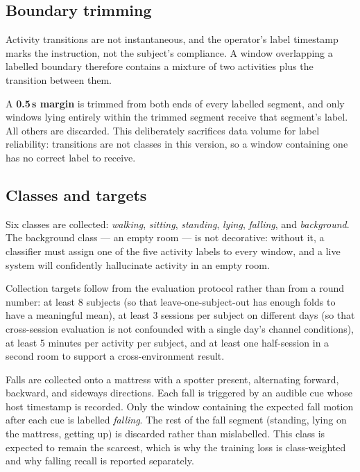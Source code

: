 \subsection{Boundary trimming}

Activity transitions are not instantaneous, and the operator's label
timestamp marks the instruction, not the subject's compliance. A window
overlapping a labelled boundary therefore contains a mixture of two
activities plus the transition between them.

A \textbf{0.5\,s margin} is trimmed from both ends of every labelled
segment, and only windows lying entirely within the trimmed segment receive
that segment's label. All others are discarded. This deliberately sacrifices
data volume for label reliability: transitions are not classes in this
version, so a window containing one has no correct label to receive.

\subsection{Classes and targets}

Six classes are collected: \emph{walking}, \emph{sitting}, \emph{standing},
\emph{lying}, \emph{falling}, and \emph{background}. The background class
--- an empty room --- is not decorative: without it, a classifier must
assign one of the five activity labels to every window, and a live system
will confidently hallucinate activity in an empty room.

Collection targets follow from the evaluation protocol rather than from a
round number: at least 8 subjects (so that leave-one-subject-out has enough
folds to have a meaningful mean), at least 3 sessions per subject on
different days (so that cross-session evaluation is not confounded with a
single day's channel conditions), at least 5 minutes per activity per
subject, and at least one half-session in a second room to support a
cross-environment result.

Falls are collected onto a mattress with a spotter present, alternating
forward, backward, and sideways directions. Each fall is triggered by an
audible cue whose host timestamp is recorded. Only the window containing the
expected fall motion after each cue is labelled \emph{falling}. The rest of
the fall segment (standing, lying on the mattress, getting up) is discarded
rather than mislabelled. This class is expected to remain
the scarcest, which is why the training loss is class-weighted and why
falling recall is reported separately.


